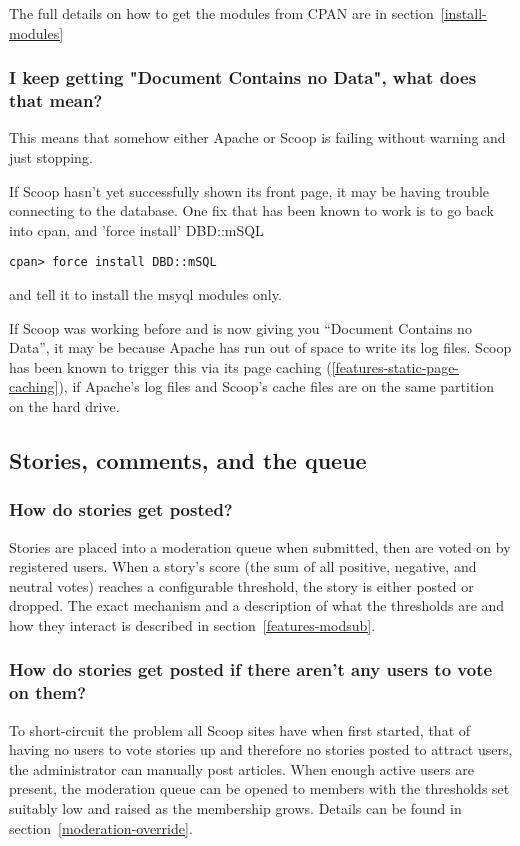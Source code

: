 The full details on how to get the modules from CPAN are in section~\ref{install-modules}

\subsubsection{I keep getting "Document Contains no Data", what does that mean?}

This means that somehow either Apache or Scoop is failing without warning and just stopping. 

If Scoop hasn't yet successfully shown its front page, it may be having trouble connecting to the database. One fix that has been known to work is to go back into cpan, and 'force install' DBD::mSQL
\begin{verbatim}
cpan> force install DBD::mSQL
\end{verbatim}
and tell it to install the msyql modules only.

If Scoop was working before and is now giving you ``Document Contains no Data'', it may be because Apache has run out of space to write its log files. Scoop has been known to trigger this via its page caching (\ref{features-static-page-caching}), if Apache's log files and Scoop's cache files are on the same partition on the hard drive.

\subsection{Stories, comments, and the queue}

\subsubsection{How do stories get posted?}

Stories are placed into a moderation queue when submitted, then are voted on by registered users. When a story's score (the sum of all positive, negative, and neutral votes) reaches a configurable threshold, the story is either posted or dropped. The exact mechanism and a description of what the thresholds are and how they interact is described in section~\ref{features-modsub}.

\subsubsection{How do stories get posted if there aren't any users to vote on them?}

To short-circuit the problem all Scoop sites have when first started, that of having no users to vote stories up and therefore no stories posted to attract users, the administrator can manually post articles. When enough active users are present, the moderation queue can be opened to members with the thresholds set suitably low and raised as the membership grows. Details can be found in section~\ref{moderation-override}.

